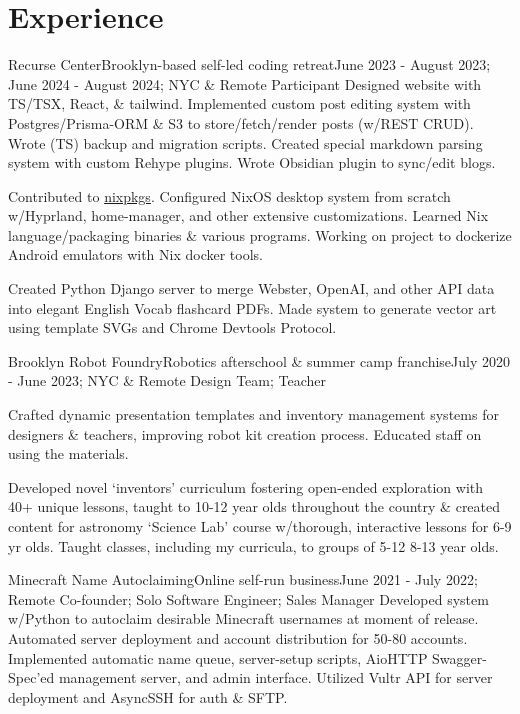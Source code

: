 \documentclass[letterpaper, 10pt]{article}
\begin{document}
\resumeSubHeadingListEnd

\section{Experience}
\resumeSubHeadingListStart

\resumeSubheading
{Recurse Center}{Brooklyn-based self-led coding retreat}{June 2023 - August 2023; June 2024 - August 2024; NYC \& Remote}
{Participant}{}{}
\resumeItemListStart
{}
{Designed website with TS/TSX, React, \& tailwind. Implemented custom post editing system with Postgres/Prisma-ORM \& S3 to store/fetch/render posts (w/REST CRUD). Wrote (TS) backup and migration scripts. Created special markdown parsing system with custom Rehype plugins. Wrote Obsidian plugin to sync/edit blogs.}

{Contributed to \href{https://github.com/NixOS/nixpkgs}{nixpkgs}. Configured NixOS desktop system from scratch w/Hyprland, home-manager, and other extensive customizations. Learned Nix language/packaging binaries \& various programs. Working on project to dockerize Android emulators with Nix docker tools.}

{Created Python Django server to merge Webster, OpenAI, and other API data into elegant English Vocab flashcard PDFs. Made system to generate vector art using template SVGs and Chrome Devtools Protocol.}
\resumeItemListEnd

\resumeSubheading
{Brooklyn Robot Foundry}{Robotics afterschool \& summer camp franchise}{July 2020 - June 2023; NYC \& Remote}
{Design Team; Teacher}{}{}

\resumeItemListStart
{}
{Crafted dynamic presentation templates and inventory management systems for designers \& teachers, improving robot kit creation process. Educated staff on using the materials.}

{Developed novel `inventors' curriculum fostering open-ended exploration with 40+ unique lessons, taught to 10-12 year olds throughout the country \& created content for astronomy `Science Lab' course w/thorough, interactive lessons for 6-9 yr olds. Taught classes, including my curricula, to groups of 5-12 8-13 year olds.}
\resumeItemListEnd

\resumeSubheading
{Minecraft Name Autoclaiming}{Online self-run business}{June 2021 - July 2022; Remote}
{Co-founder; Solo Software Engineer; Sales Manager}{}{}
\resumeItemListStart
{}
{Developed system w/Python to autoclaim desirable Minecraft usernames at moment of release. Automated server deployment and account distribution for 50-80 accounts. Implemented automatic name queue, server-setup scripts, AioHTTP Swagger-Spec'ed management server, and admin interface. Utilized Vultr API for server deployment and AsyncSSH for auth \& SFTP.}
\end{document}
